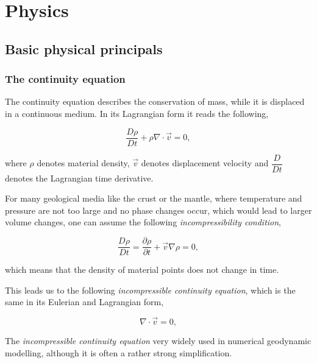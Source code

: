 
\section{Physics}
\label{chp:II_2}

\subsection{Basic physical principals}

\subsubsection{The continuity equation}

The continuity equation describes the conservation of mass, while it is displaced in a continuous medium. In its Lagrangian form it reads the following,

\begin{equation}\label{eqs:cont_general}
\dfrac{D \rho}{D t} + \rho \nabla\cdot\vec{v} = 0,
\end{equation}

where $\rho$ denotes material density, $\vec{v}$ denotes displacement velocity and $\dfrac{D}{D t}$ denotes the Lagrangian time derivative.

For many geological media like the crust or the mantle, where temperature and pressure are not too large and no phase changes occur, which would lead to larger volume changes, one can assume the following \textit{incompressibility condition},

\begin{equation}\label{eqs:imcompress}
\dfrac{D \rho}{D t} = \dfrac{\partial \rho}{\partial t} +\vec{v} \nabla\rho = 0,
\end{equation}

which means that the density of material points does not change in time.

This leads us to the following \textit{incompressible continuity equation}, which is the same in its Eulerian and Lagrangian form,

\begin{equation}
\nabla\cdot\vec{v}=0,
\end{equation}

The \textit{incompressible continuity equation} very widely used in numerical geodynamic modelling, although it is often a rather strong simplification.

